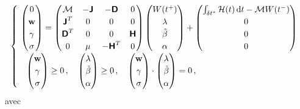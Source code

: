\begin{align} \label{eq:bilan3}
\begin{cases} \,\,
    \begin{pmatrix}
        0 \\ \bvec{w} \\ \gamma \\ \sigma 
    \end{pmatrix} =  
    \begin{pmatrix}
        \mathcal{M} &  -\bmat{J} & -\bmat{D} & 0 \\
        \bmat{J}^T & 0 & 0 & 0 \\
        \bmat{D}^T & 0 & 0 & \bmat{H} \\
        0 & \mu & -\bmat{H}^T & 0
    \end{pmatrix} 
    \begin{pmatrix}
        W(t^+) \\ \lambda \\ \tilde{\beta} \\ \alpha
    \end{pmatrix} + 
    \begin{pmatrix}
        \int_{\delta t^*} \mathcal{H}(t) \diff t - \mathcal{M} W(t^{-}) \\ 0 \\ 0 \\ 0
    \end{pmatrix} \\ \quad
    \begin{pmatrix}
        \bvec{w} \\ \gamma \\ \sigma
    \end{pmatrix} \geq 0 \,, \quad
    \begin{pmatrix}
        \lambda \\ \tilde{\beta} \\ \alpha
    \end{pmatrix} \geq 0 \,, \quad
    \begin{pmatrix}
        \bvec{w} \\ \gamma \\ \sigma
    \end{pmatrix} \cdot
    \begin{pmatrix}
        \lambda \\ \tilde{\beta} \\ \alpha
    \end{pmatrix}  
     = 0 \,,
\end{cases}
\end{align}
avec
